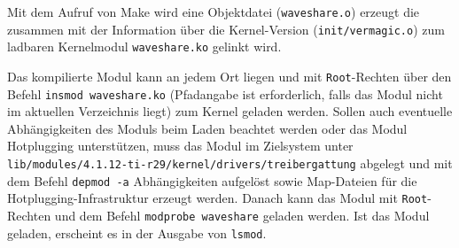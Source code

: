 Mit dem Aufruf von Make wird eine Objektdatei (\texttt{waveshare.o}) erzeugt die zusammen mit der Information über die Kernel-Version (\texttt{init/vermagic.o}) zum ladbaren Kernelmodul \texttt{waveshare.ko} gelinkt wird. %


Das kompilierte Modul kann an jedem Ort liegen und mit \texttt{Root}-Rechten über den Befehl \texttt{insmod waveshare.ko} (Pfadangabe ist erforderlich, falls das Modul nicht im aktuellen Verzeichnis liegt) zum Kernel geladen werden. Sollen auch eventuelle Abhängigkeiten des Moduls beim Laden beachtet werden oder das Modul Hotplugging unterstützen, muss das Modul im Zielsystem unter \texttt{lib/modules/4.1.12-ti-r29/kernel/drivers/treibergattung} abgelegt und mit dem Befehl \texttt{depmod -a} Abhängigkeiten aufgelöst sowie Map-Dateien für die Hotplugging-Infrastruktur erzeugt werden. %
Danach kann das Modul mit \texttt{Root}-Rechten und dem Befehl \texttt{modprobe waveshare} geladen werden. Ist das Modul geladen, erscheint es in der Ausgabe von \texttt{lsmod}. %





